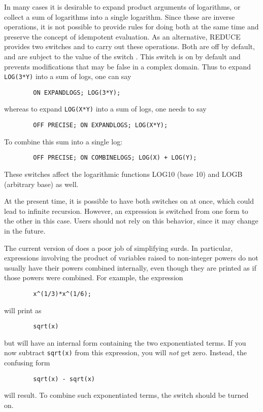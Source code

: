 \hypertarget{switch:COMBINELOGS}{}
\hypertarget{switch:EXPANDLOGS}{}
In many cases it is desirable to expand product arguments of logarithms,
or collect a sum of logarithms into a single logarithm.  Since these are
inverse operations, it is not possible to provide rules for doing both at
the same time and preserve the {\REDUCE} concept of idempotent evaluation.
As an alternative, REDUCE provides two switches
 and
 to carry
out these operations.  Both are off by default, and are subject
to the value of the switch . This switch is on
by default and prevents modifications that may be false in a complex domain.
Thus to expand \texttt{LOG(3*Y)} into a sum of logs, one can say
\begin{verbatim}
        ON EXPANDLOGS; LOG(3*Y);
\end{verbatim}
whereas to expand \texttt{LOG(X*Y)} into a sum of logs, one needs to say
\begin{verbatim}
        OFF PRECISE; ON EXPANDLOGS; LOG(X*Y);
\end{verbatim}
To combine this sum into a single log:
\begin{verbatim}
        OFF PRECISE; ON COMBINELOGS; LOG(X) + LOG(Y);
\end{verbatim}

These switches affect the logarithmic functions LOG10 (base 10) and LOGB
(arbitrary base) as well.

At the present time, it is possible to have both switches on at once,
which could lead to infinite recursion.  However, an expression is
switched from one form to the other in this case.  Users should not rely
on this behavior, since it may change in the future.

\hypertarget{switch:COMBINEEXPT}{}
The current version of {\REDUCE} does a poor job of simplifying surds.  In
particular, expressions involving the product of variables raised to
non-integer powers do not usually have their powers combined internally,
even though they are printed as if those powers were combined.  For
example, the expression
\begin{verbatim}
        x^(1/3)*x^(1/6);
\end{verbatim}
will print as
\begin{verbatim}
        sqrt(x)
\end{verbatim}
but will have an internal form containing the two exponentiated terms.
If you now subtract \texttt{sqrt(x)} from this expression, you will
\emph{not} get zero.  Instead, the confusing form
\begin{verbatim}
        sqrt(x) - sqrt(x)
\end{verbatim}
will result.  To combine such exponentiated terms, the switch
 should be turned on.

